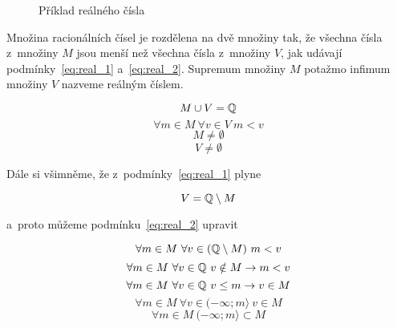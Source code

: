 \begin{figure}[!h]
\centering
{}
\caption{Příklad reálného čísla}
\label{img:real_numbers_example}
\end{figure}

Množina racionálních čísel je rozdělena na dvě množiny tak, že všechna čísla z~množiny \(M\) jsou menší než všechna čísla z~množiny \(V\), jak udávají podmínky~\eqref{eq:real_1} a~\eqref{eq:real_2}. Supremum množiny \(M\) potažmo infimum množiny \(V\) nazveme reálným číslem.

\begin{equation}
\label{eq:real_1}
M \cup V = \mathbb{Q}
\end{equation}
\begin{equation}
\label{eq:real_2}
\forall m \in M \ \forall v \in V \ m < v
\end{equation}
\begin{equation}
\label{eq:real_3}
M \neq \emptyset
\end{equation}
\begin{equation}
\label{eq:real_4}
V \neq \emptyset
\end{equation}

Dále si všimněme, že z~podmínky~\eqref{eq:real_1} plyne

\begin{equation}
V = \mathbb{Q} \setminus M
\end{equation}

a~proto můžeme podmínku~\eqref{eq:real_2} upravit

\begin{equation}
\forall m \in M \ \forall v \in (\mathbb{Q} \setminus M) \ m < v
\end{equation}
\begin{equation}
\forall m \in M \ \forall v \in \mathbb{Q} \ v \notin M \rightarrow m < v
\end{equation}
\begin{equation}
\forall m \in M \ \forall v \in \mathbb{Q} \ v \leq m \rightarrow v \in M
\end{equation}
\begin{equation}
\forall m \in M \ \forall v \in (-\infty; m \rangle \ v \in M
\end{equation}
\begin{equation}
\label{eq:real_single_set}
\forall m \in M \ (-\infty; m \rangle \subset M
\end{equation}

